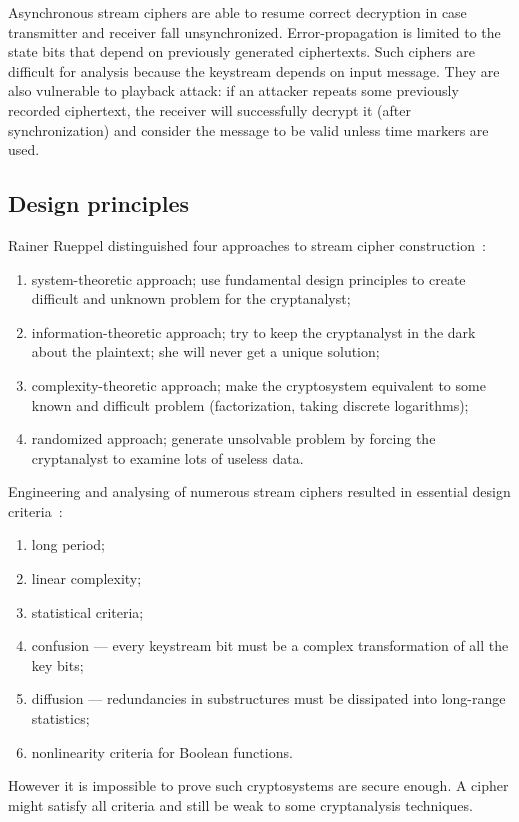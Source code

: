 Asynchronous stream ciphers are able to resume correct decryption in case
transmitter and receiver fall unsynchronized. Error-propagation is limited to
the state bits that depend on previously generated ciphertexts. Such ciphers are
difficult for analysis because the keystream depends on input message. They
are also vulnerable to playback attack: if an attacker repeats some previously
recorded ciphertext, the receiver will successfully decrypt it (after
synchronization) and consider the message to be valid unless time markers are
used.

\subsection{Design principles}

Rainer Rueppel distinguished four approaches to stream cipher
construction~\cite{schneier:applied_cryptography:2}:
\begin{enumerate}
    \item system-theoretic approach; use fundamental design principles to create
        difficult and unknown problem for the cryptanalyst;
    \item information-theoretic approach; try to keep the cryptanalyst in the
        dark about the plaintext; she will never get a unique solution;
    \item complexity-theoretic approach; make the cryptosystem equivalent to
        some known and difficult problem (factorization, taking discrete
        logarithms);
    \item randomized approach; generate unsolvable problem by forcing the
        cryptanalyst to examine lots of useless data.
\end{enumerate}
Engineering and analysing of numerous stream ciphers resulted in essential
design criteria~\cite{rueppel1986analysis}:
\begin{enumerate}
    \item long period;
    \item linear complexity;
    \item statistical criteria;
    \item confusion --- every keystream bit must be a complex transformation of
        all the key bits;
    \item diffusion --- redundancies in substructures must be dissipated into
        long-range statistics;
    \item nonlinearity criteria for Boolean functions.
\end{enumerate}
However it is impossible to prove such cryptosystems are secure enough. A cipher
might satisfy all criteria and still be weak to some cryptanalysis techniques.

